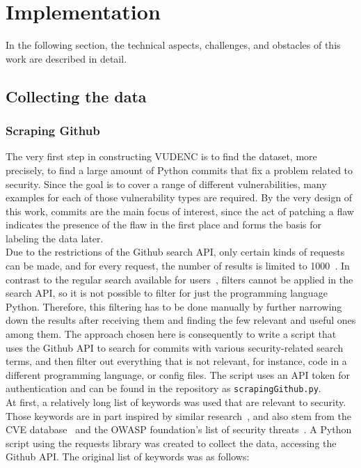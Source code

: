 \documentclass[
a4paper,
pagesize,
pdftex,
12pt,
twoside, %
BCOR=5mm, %
ngerman,
fleqn,
final,
]{scrartcl}
\begin{document}
	
	
	\newpage
	\section{Implementation}\label{Implementation}
	In the following section, the technical aspects, challenges, and obstacles of this work are described in detail.
	
	\subsection{Collecting the data}
	\subsubsection{Scraping Github}
	The very first step in constructing VUDENC is to find the dataset, more precisely, to find a large amount of Python commits that fix a problem related to security. Since the goal is to cover a range of different vulnerabilities, many examples for each of those vulnerability types are required. By the very design of this work, commits are the main focus of interest, since the act of patching a flaw indicates the presence of the flaw in the first place and forms the basis for labeling the data later.\\	
	Due to the restrictions of the Github search API, only certain kinds of requests can be made, and for every request, the number of results is limited to 1000~\cite{Github.com.2}. In contrast to the regular search available for users~\cite{Github.com.2019}, filters cannot be applied in the search API, so it is not possible to filter for just the programming language Python. Therefore, this filtering has to be done manually by further narrowing down the results after receiving them and finding the few relevant and useful ones among them.
	The approach chosen here is consequently to write a script that uses the Github API to search for commits with various security-related search terms, and then filter out everything that is not relevant, for instance, code in a different programming language, or config files. The script uses an API token for authentication and can be found in the repository as \texttt{scrapingGithub.py}.\\
	At first, a relatively long list of keywords was used that are relevant to security. Those keywords are in part inspired by similar research~\cite{Zhou.2017}, and also stem from the CVE database~\cite{CVE} and the OWASP foundation's list of security threats~\cite{OWASPFoundation.}. A Python script using the requests library was created to collect the data, accessing the Github API. The original list of keywords was as follows:
	\lstset{basicstyle=\small}
	
\end{document}
